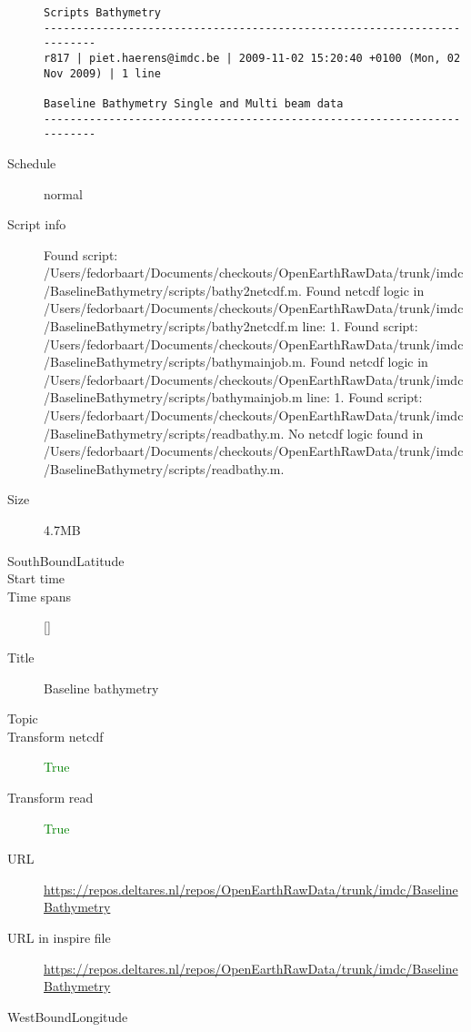 \documentclass[9]{report}
\begin{document}
\begin{description}
\begin{verbatim}
Scripts Bathymetry
------------------------------------------------------------------------
r817 | piet.haerens@imdc.be | 2009-11-02 15:20:40 +0100 (Mon, 02 Nov 2009) | 1 line

Baseline Bathymetry Single and Multi beam data
------------------------------------------------------------------------

\end{verbatim}
  \item[Schedule] normal
  \item[Script info] Found script: /Users/fedorbaart/Documents/checkouts/OpenEarthRawData/trunk/imdc/BaselineBathymetry/scripts/bathy2netcdf.m.
Found netcdf logic in /Users/fedorbaart/Documents/checkouts/OpenEarthRawData/trunk/imdc/BaselineBathymetry/scripts/bathy2netcdf.m line: 1.
Found script: /Users/fedorbaart/Documents/checkouts/OpenEarthRawData/trunk/imdc/BaselineBathymetry/scripts/bathymainjob.m.
Found netcdf logic in /Users/fedorbaart/Documents/checkouts/OpenEarthRawData/trunk/imdc/BaselineBathymetry/scripts/bathymainjob.m line: 1.
Found script: /Users/fedorbaart/Documents/checkouts/OpenEarthRawData/trunk/imdc/BaselineBathymetry/scripts/readbathy.m.
No netcdf logic found in /Users/fedorbaart/Documents/checkouts/OpenEarthRawData/trunk/imdc/BaselineBathymetry/scripts/readbathy.m.
  \item[Size] 4.7MB
  \item[SouthBoundLatitude] 
  \item[Start time] 
  \item[Time spans] []
  \item[Title]  Baseline bathymetry 
  \item[Topic] 
  \item[Transform netcdf] \textcolor{green}{True}
  \item[Transform read] \textcolor{green}{True}
  \item[URL] \href{https://repos.deltares.nl/repos/OpenEarthRawData/trunk/imdc/BaselineBathymetry}{https://repos.deltares.nl/repos/OpenEarthRawData/trunk/imdc/BaselineBathymetry}
  \item[URL in inspire file] \href{https://repos.deltares.nl/repos/OpenEarthRawData/trunk/imdc/BaselineBathymetry}{https://repos.deltares.nl/repos/OpenEarthRawData/trunk/imdc/BaselineBathymetry}
  \item[WestBoundLongitude] 
\end{description}
\end{document}

